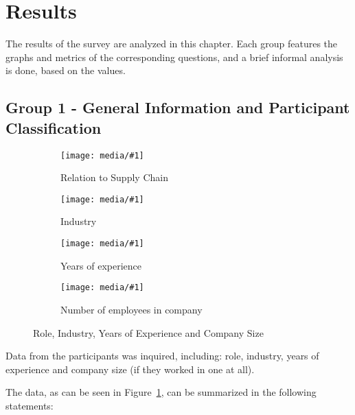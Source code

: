 
\section{Results}



The results of the survey are analyzed in this chapter. Each group features the graphs and metrics of the corresponding questions, and a brief informal analysis is done, based on the values.



\subsection{Group 1 - General Information and Participant Classification}

\newcommand{\resfig}[2]{
    \begin{subfigure}{.55\textwidth}
        \centering
        \texttt{[image: media/\#1]}
        \caption{#2}
    \end{subfigure}
}

\begin{figure}[ht]

    \resfig{sc_role}{Relation to Supply Chain}
    \resfig{sc_industry}{Industry}

    \resfig{sc_experience}{Years of experience}
    \resfig{nr_employees}{Number of employees in company}

      \caption{Role, Industry, Years of Experience and Company Size}
    \label{fig:group1_graphics}
\end{figure}


Data from the participants was inquired, including: role, industry, years of experience and company size (if  they worked in one at all).

The data, as can be seen in Figure~\ref{fig:group1_graphics}, can be summarized in the following statements:



